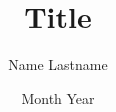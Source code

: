 \documentclass[11pt]{book}
\begin{document}
\author{Name Lastname}
\title{Title}
\date{Month Year}

\frontmatter
\tableofcontents


\mainmatter




\backmatter


\printindex %
\end{document}
